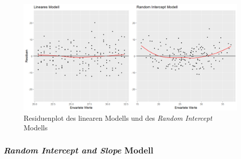 \documentclass[12pt]{article}\usepackage[]{graphicx}\usepackage[]{color}
\numberwithin{equation}{section}
\begin{document}
\begin{figure}[t!]
\centering
\includegraphics[width = \textwidth]{residuen_lm_rim}
\caption{Residuenplot des linearen Modells und des \textit{Random Intercept} Modells}
\label{fig:resid_lm_rim}
\end{figure}

\subsubsection{\textit{Random Intercept and Slope} Modell}
\end{document}
